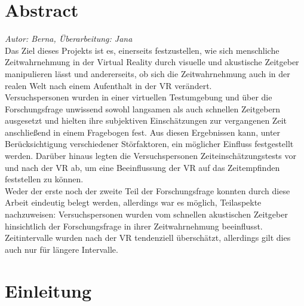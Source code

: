 \documentclass{Paper}
\begin{document}
\maketitle


\tableofcontents
\clearpage

\section*{Abstract}
	\textit{Autor: Berna, Überarbeitung: Jana}\\
Das Ziel dieses Projekts ist es, einerseits festzustellen, wie sich menschliche Zeitwahrnehmung in der Virtual Reality durch visuelle und akustische Zeitgeber manipulieren lässt und andererseits, ob sich die Zeitwahrnehmung auch in der realen Welt nach einem Aufenthalt in der VR verändert.\\
Versuchspersonen wurden in einer virtuellen Testumgebung und über die Forschungsfrage unwissend sowohl langsamen als auch schnellen Zeitgebern ausgesetzt und hielten ihre subjektiven Einschätzungen zur vergangenen Zeit anschließend in einem Fragebogen fest. Aus diesen Ergebnissen kann, unter Berücksichtigung verschiedener Störfaktoren, ein möglicher Einfluss festgestellt werden. Darüber hinaus legten die Versuchspersonen Zeiteinschätzungstests vor und nach der VR ab, um eine Beeinflussung der VR auf das Zeitempfinden feststellen zu können.\\
Weder der erste noch der zweite Teil der Forschungsfrage konnten durch diese Arbeit eindeutig belegt werden, allerdings war es möglich, Teilaspekte nachzuweisen: Versuchspersonen wurden vom schnellen akustischen Zeitgeber hinsichtlich der Forschungsfrage in ihrer Zeitwahrnehmung beeinflusst. Zeitintervalle wurden nach der VR tendenziell überschätzt, allerdings gilt dies auch nur für längere Intervalle. 


\section{Einleitung}
\end{document}
